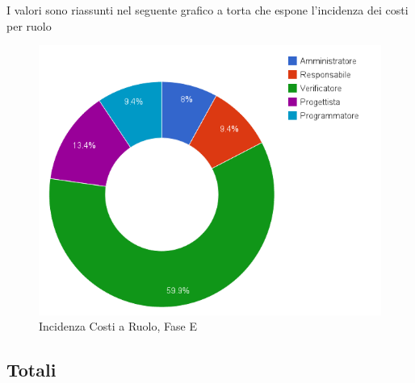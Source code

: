 I valori sono riassunti nel seguente grafico a torta che espone l'incidenza dei costi per ruolo
\begin{figure}[!h]
	\centering
	\includegraphics[width=0.9\linewidth]{./content/Immagini/prospetti/costiVV.png}
	\caption{Incidenza Costi a Ruolo, Fase E}
\end{figure}
\pagebreak

\subsection{Totali}
\label{TotaliLav}
